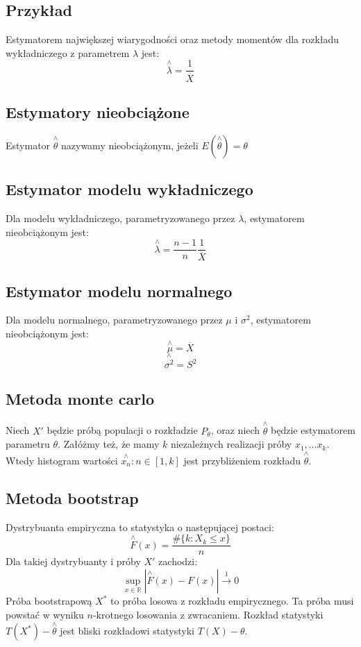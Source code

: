 \documentclass{../notatki}
\begin{document}
\subsection{Przykład}

Estymatorem największej wiarygodności oraz metody momentów dla rozkładu
wykładniczego z parametrem $\lambda$ jest:
$$
\stackrel{\wedge}{\lambda} = \frac{1}{\overline{X}}
$$

\subsection{Estymatory nieobciążone}

Estymator $\stackrel{\wedge}{\theta}$ nazywamy nieobciążonym, jeżeli
$E(\stackrel{\wedge}{\theta}) = \theta$

\subsection{Estymator modelu wykładniczego}

Dla modelu wykładniczego, parametryzowanego przez $\lambda$, estymatorem
nieobciążonym jest:
$$
\stackrel{\wedge}{\lambda} = \frac{n - 1}{n} \frac{1}{\overline{X}}
$$

\subsection{Estymator modelu normalnego}

Dla modelu normalnego, parametryzowanego przez $\mu$ i $\sigma^2$, estymatorem
nieobciążonym jest:
$$
\stackrel{\wedge}{\mu} = \overline{X}
$$
$$
\stackrel{\wedge}{\sigma^2} = S^2
$$

\subsection{Metoda monte carlo}

Niech $X'$ będzie próbą populacji o rozkładzie $P_\theta$, oraz niech
$\stackrel{\wedge}{\theta}$ będzie estymatorem parametru $\theta$. Załóżmy też,
że mamy $k$ niezależnych realizacji próby $x_1, \dots x_k$. Wtedy histogram
wartości $\stackrel{\wedge}{x_n}: n \in [1, k]$ jest przybliżeniem rozkładu
$\stackrel{\wedge}{\theta}$.

\subsection{Metoda bootstrap}

Dystrybuanta empiryczna to statystyka o następującej postaci:
$$
\stackrel{\wedge}{F}(x) = \frac{\#\{k: X_k \le x\}}{n}
$$
Dla takiej dystrybuanty i próby $X'$ zachodzi:
$$
\sup_{x \in \mathbb{R}} |\stackrel{\wedge}{F}(x) - F(x)| \xrightarrow{1} 0
$$
Próba bootstrapową $X^*$ to próba losowa z rozkładu empirycznego. Ta próba musi
powstać w wyniku $n$-krotnego losowania z zwracaniem. Rozkład statystyki
$T(X^*) - \stackrel{\wedge}{\theta}$ jest bliski rozkładowi statystyki
$T(X) - \theta$.
\end{document}
